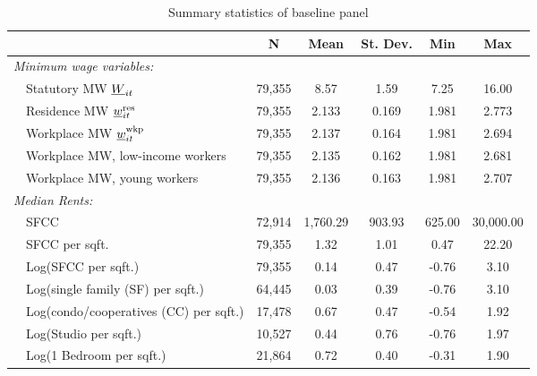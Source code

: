 \begin{table}[hbt!] \centering
    \caption{Summary statistics of baseline panel}
    \label{tab:stats_est_panel}
    \begin{tabular}{@{}lccccc@{}}
        \toprule
                                          & \multicolumn{1}{c}{N} 
                                          & \multicolumn{1}{c}{Mean} 
                                          & \multicolumn{1}{c}{St. Dev.} 
                                          & \multicolumn{1}{c}{Min} 
                                          & \multicolumn{1}{c}{Max}                 \\ \midrule
        \textit{Minimum wage variables:}              &       &       &       &       &       \\
        $\quad$Statutory MW $\underline{W}_{it}$                & 79,355  & 8.57  & 1.59  & 7.25  & 16.00  \\
        $\quad$Residence MW $\underline{w}^{\text{res}}_{it}$         & 79,355  & 2.133  & 0.169  & 1.981  & 2.773  \\
        $\quad$Workplace MW $\underline{w}^{\text{wkp}}_{it}$         & 79,355  & 2.137  & 0.164  & 1.981  & 2.694  \\
        $\quad$Workplace MW, low-income workers       & 79,355  & 2.135  & 0.162  & 1.981  & 2.681  \\
        $\quad$Workplace MW, young workers            & 79,355  & 2.136  & 0.163  & 1.981  & 2.707  \\[.3em]
        \textit{Median Rents:}                        &       &       &       &       &       \\
        $\quad$SFCC                                   & 72,914  & 1,760.29  & 903.93  & 625.00  & 30,000.00  \\
        $\quad$SFCC per sqft.                         & 79,355  & 1.32  & 1.01  & 0.47  & 22.20  \\
        $\quad$Log(SFCC per sqft.)                    & 79,355  & 0.14  & 0.47  & -0.76  & 3.10  \\
        $\quad$Log(single family (SF) per sqft.)      & 64,445  & 0.03  & 0.39  & -0.76  & 3.10  \\
        $\quad$Log(condo/cooperatives (CC) per sqft.) & 17,478  & 0.67  & 0.47  & -0.54  & 1.92  \\
        $\quad$Log(Studio per sqft.)                  & 10,527  & 0.44  & 0.76  & -0.76  & 1.97  \\
        $\quad$Log(1 Bedroom per sqft.)               & 21,864  & 0.72  & 0.40  & -0.31  & 1.90  \\

\end{tabular}
\end{table}
